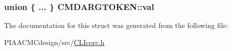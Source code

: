 \hypertarget{structCMDARGTOKEN_a96839ddcbefc8d1629d9be94a1319bc3}{
\subsubsection[{val}]{\setlength{\rightskip}{0pt plus 5cm}union \{ ... \}   C\+M\+D\+A\+R\+G\+T\+O\+K\+E\+N\+::val}}\label{structCMDARGTOKEN_a96839ddcbefc8d1629d9be94a1319bc3}


The documentation for this struct was generated from the following file\+:\begin{DoxyCompactItemize}
\item 
P\+I\+A\+A\+C\+M\+Cdesign/src/\hyperlink{PIAACMCdesign_2src_2CLIcore_8h}{C\+L\+Icore.\+h}\end{DoxyCompactItemize}
